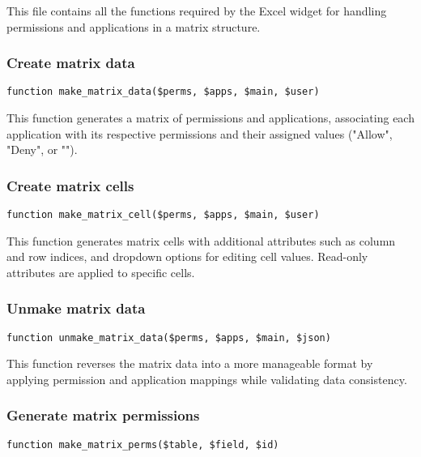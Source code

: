 \documentclass[a4paper]{article}
\begin{document}
This file contains all the functions required by the Excel widget for handling
permissions and applications in a matrix structure.

\hypertarget{toc177}{}
\subsubsection{Create matrix data}

\begin{lstlisting}
function make_matrix_data($perms, $apps, $main, $user)
\end{lstlisting}

This function generates a matrix of permissions and applications, associating each
application with its respective permissions and their assigned values ("Allow", "Deny", or "").

\hypertarget{toc178}{}
\subsubsection{Create matrix cells}

\begin{lstlisting}
function make_matrix_cell($perms, $apps, $main, $user)
\end{lstlisting}

This function generates matrix cells with additional attributes such as column and row indices,
and dropdown options for editing cell values. Read-only attributes are applied to specific cells.

\hypertarget{toc179}{}
\subsubsection{Unmake matrix data}

\begin{lstlisting}
function unmake_matrix_data($perms, $apps, $main, $json)
\end{lstlisting}

This function reverses the matrix data into a more manageable format by applying
permission and application mappings while validating data consistency.

\hypertarget{toc180}{}
\subsubsection{Generate matrix permissions}

\begin{lstlisting}
function make_matrix_perms($table, $field, $id)
\end{lstlisting}
\end{document}
